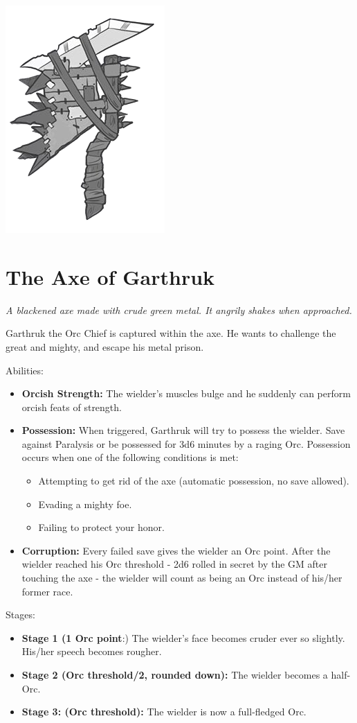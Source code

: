 \documentclass[letterpaper,sansserif,tightsqueeze]{rpg-module}
\begin{document}
\begin{center}
	\includegraphics[width = 0.5\linewidth]{Garthruks_axe.png}
\end{center}
\section{The Axe of Garthruk}
\textit{A blackened axe made with crude green metal. It angrily shakes when approached.}

Garthruk the Orc Chief is captured within the axe. He wants to challenge the great and mighty, and escape his metal prison.

Abilities:
\begin{itemize}
	\item \textbf{Orcish Strength:} The wielder's muscles bulge and he suddenly can perform orcish feats of strength.
	\item \textbf{Possession:} When triggered, Garthruk will try to possess the wielder. Save against Paralysis or be possessed for 3d6 minutes by a raging Orc. Possession occurs when one of the following conditions is met:
	\begin{itemize}
		\item Attempting to get rid of the axe (automatic possession, no save allowed).
		\item Evading a mighty foe.
		\item Failing to protect your honor.
	\end{itemize}
	\item \textbf{Corruption:} Every failed save gives the wielder an Orc point. After the wielder reached his Orc threshold - 2d6 rolled in secret by the GM after touching the axe - the wielder will count as being an Orc instead of his/her former race.
\end{itemize}
Stages: 
\begin{itemize}
	\item \textbf{Stage 1 (1 Orc point}:) The wielder's face becomes cruder ever so slightly. His/her speech becomes rougher. 
	\item \textbf{Stage 2 (Orc threshold/2, rounded down):} The wielder becomes a half-Orc.
	\item \textbf{Stage 3: (Orc threshold):} The wielder is now a full-fledged Orc.
\end{itemize}
\end{document}
